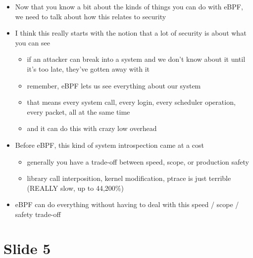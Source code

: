 \documentclass[
  12pt]{findlay}
\providecommand{\tightlist}{\setlength{\itemsep}{0pt}\setlength{\parskip}{0pt}}
\begin{document}
\begin{itemize}
\tightlist
\item
  Now that you know a bit about the kinds of things you can do with
  eBPF, we need to talk about how this relates to security
\item
  I think this really starts with the notion that a lot of security is
  about what you can see

  \begin{itemize}
  \tightlist
  \item
    if an attacker can break into a system and we don't know about it
    until it's too late, they've gotten away with it
  \item
    remember, eBPF lets us see everything about our system
  \item
    that means every system call, every login, every scheduler
    operation, every packet, all at the same time
  \item
    and it can do this with crazy low overhead
  \end{itemize}
\item
  Before eBPF, this kind of system introspection came at a cost

  \begin{itemize}
  \tightlist
  \item
    generally you have a trade-off between speed, scope, or production
    safety
  \item
    library call interposition, kernel modification, ptrace is just
    terrible (REALLY slow, up to 44,200\%)
  \end{itemize}
\item
  eBPF can do everything without having to deal with this speed / scope
  / safety trade-off
\end{itemize}

\hypertarget{slide-5}{%
\section{Slide 5}\label{slide-5}}
\end{document}
